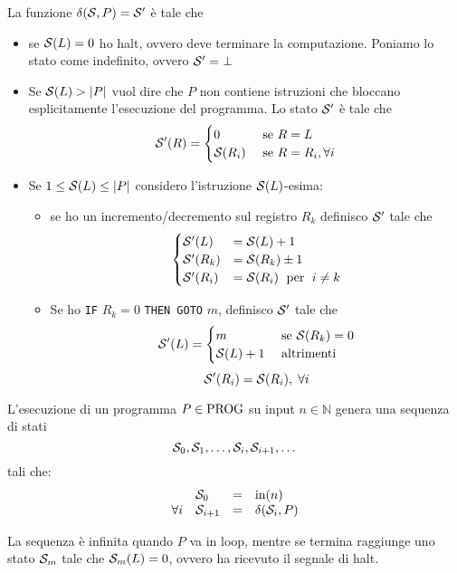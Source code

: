 La funzione $\delta (\mathcal{S}, P) = \mathcal{S}'$ è tale che
\begin{itemize}
	\item se $\mathcal{S}(L) = 0$ ho halt, ovvero deve terminare la computazione. Poniamo lo stato come indefinito, ovvero $\mathcal{S}' = \bot$
	
    \item Se $\mathcal{S}(L)>|P|$ vuol dire che $P$ non contiene istruzioni che bloccano esplicitamente l'esecuzione del programma. Lo stato $\mathcal{S}'$ è tale che 
	$$ 
	\mathcal{S}'(R) = \begin{cases}
		0 & \text{ se } R = L \\
		\mathcal{S}(R_i) &\text{ se } R = R_i, \forall i
	\end{cases}
	$$
	
    \item Se $1 \leq \mathcal{S}(L) \leq |P|$ considero l'istruzione $\mathcal{S}(L)$-esima:
	\begin{itemize}
		\item se ho un incremento/decremento sul registro $R_k$ definisco $\mathcal{S}'$ tale che 
		$$ 
		\begin{cases}
			\mathcal{S}'(L) & = \mathcal{S} (L) + 1\\
			\mathcal{S}'(R_k) & = \mathcal{S} (R_k) \pm 1\\
			\mathcal{S}'(R_i) & = \mathcal{S} (R_i) \; \text{ per } \; i \neq k \\
		\end{cases}
		$$
	
    	\item Se ho \verb|IF| $R_k = 0$ \verb|THEN GOTO| $m$, definisco $\mathcal{S}'$ tale che
		$$ 
		\mathcal{S}' (L) = \begin{cases}
			m & \text{ se } \mathcal{S} (R_k) = 0 \\
			\mathcal{S} (L) + 1 & \text{ altrimenti}
		\end{cases}
		$$
		$$ \mathcal{S}' (R_i) = \mathcal{S} (R_i), \; \forall i $$
	\end{itemize}
\end{itemize}

L'esecuzione di un programma $P \in \text{PROG}$ su input $n \in \mathbb{N}$ genera una sequenza di stati
$$ \mathcal{S}_0, \mathcal{S}_1, \dots, \mathcal{S}_i, \mathcal{S}_{i+1}, \dots $$
tali che:
$$
\begin{array}{l l c l}
	& \mathcal{S}_0 & = & \text{in}(n) \\
	\forall i & \mathcal{S}_{i+1} & = & \delta (\mathcal{S}_i,P) 
\end{array}
$$

La sequenza è infinita quando $P$ va in loop, mentre se termina raggiunge uno stato $\mathcal{S}_m$ tale che $\mathcal{S}_m (L) = 0$, ovvero ha ricevuto il segnale di halt.

